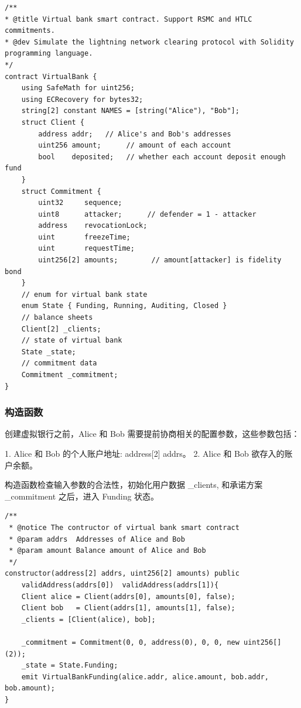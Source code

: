 \begin{appendices}
\begin{itemize}
\end{itemize}
\begin{lstlisting}[caption={虚拟银行智能合约数据结构.}, label={lst:data}]
/**
* @title Virtual bank smart contract. Support RSMC and HTLC commitments.
* @dev Simulate the lightning network clearing protocol with Solidity programming language.
*/
contract VirtualBank {
    using SafeMath for uint256;
    using ECRecovery for bytes32;
    string[2] constant NAMES = [string("Alice"), "Bob"];
    struct Client {
        address addr;   // Alice's and Bob's addresses
        uint256 amount;      // amount of each account
        bool    deposited;   // whether each account deposit enough fund
    }
    struct Commitment {
        uint32     sequence;
        uint8      attacker;      // defender = 1 - attacker
        address    revocationLock;
        uint       freezeTime;
        uint       requestTime;
        uint256[2] amounts;        // amount[attacker] is fidelity bond
    }
    // enum for virtual bank state
    enum State { Funding, Running, Auditing, Closed }
    // balance sheets
    Client[2] _clients;
    // state of virtual bank
    State _state;
    // commitment data
    Commitment _commitment;
}
\end{lstlisting}


\subsubsection{构造函数}

创建虚拟银行之前，Alice 和 Bob 需要提前协商相关的配置参数，这些参数包括：

1. Alice 和 Bob 的个人账户地址: address[2] addrs。
2. Alice 和 Bob 欲存入的账户余额。

构造函数检查输入参数的合法性，初始化用户数据 \_clients, 和承诺方案 \_commitment 之后，进入 Funding 状态。

\begin{lstlisting}[caption={构造函数.}, label={lst:constructor}]
/**
 * @notice The contructor of virtual bank smart contract
 * @param addrs  Addresses of Alice and Bob
 * @param amount Balance amount of Alice and Bob
 */
constructor(address[2] addrs, uint256[2] amounts) public 
    validAddress(addrs[0])  validAddress(addrs[1]){
    Client alice = Client(addrs[0], amounts[0], false);
    Client bob   = Client(addrs[1], amounts[1], false);
    _clients = [Client(alice), bob];
    
    _commitment = Commitment(0, 0, address(0), 0, 0, new uint256[](2));
    _state = State.Funding;
    emit VirtualBankFunding(alice.addr, alice.amount, bob.addr, bob.amount);
}
\end{lstlisting}


\end{appendices}
